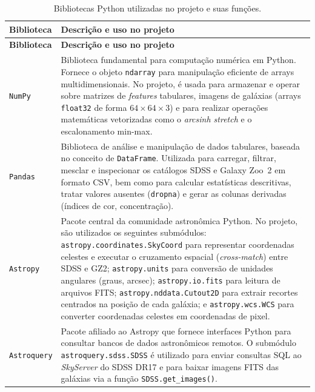 \documentclass[12pt, a4paper]{article}
\begin{document}
\begin{longtable}{lp{10.5cm}}
  \caption{Bibliotecas Python utilizadas no projeto e suas funções.}
  \label{tab:bibliotecas} \\
  \toprule
  \textbf{Biblioteca} & \textbf{Descrição e uso no projeto} \\
  \midrule
  \endfirsthead
  \toprule
  \textbf{Biblioteca} & \textbf{Descrição e uso no projeto} \\
  \midrule
  \endhead
  \bottomrule
  \endfoot

  \texttt{NumPy}
  & Biblioteca fundamental para computação numérica em Python. Fornece o
    objeto \texttt{ndarray} para manipulação eficiente de arrays
    multidimensionais. No projeto, é usada para armazenar e operar sobre
    matrizes de \textit{features} tabulares, imagens de galáxias
    (arrays \texttt{float32} de forma $64 \times 64 \times 3$) e para
    realizar operações matemáticas vetorizadas como o \textit{arcsinh
    stretch} e o escalonamento min-max. \\[6pt]

  \texttt{Pandas}
  & Biblioteca de análise e manipulação de dados tabulares, baseada no
    conceito de \texttt{DataFrame}. Utilizada para carregar, filtrar,
    mesclar e inspecionar os catálogos SDSS e Galaxy Zoo~2 em formato CSV,
    bem como para calcular estatísticas descritivas, tratar valores
    ausentes (\texttt{dropna}) e gerar as colunas derivadas (índices de
    cor, concentração). \\[6pt]

  \texttt{Astropy}
  & Pacote central da comunidade astronômica Python. No projeto, são
    utilizados os seguintes submódulos:
    \texttt{astropy.coordinates.SkyCoord} para representar coordenadas
    celestes e executar o cruzamento espacial (\textit{cross-match}) entre
    SDSS e GZ2;
    \texttt{astropy.units} para conversão de unidades angulares (graus,
    arcsec);
    \texttt{astropy.io.fits} para leitura de arquivos FITS;
    \texttt{astropy.nddata.Cutout2D} para extrair recortes centrados na
    posição de cada galáxia; e
    \texttt{astropy.wcs.WCS} para converter coordenadas celestes em
    coordenadas de pixel. \\[6pt]

  \texttt{Astroquery}
  & Pacote afiliado ao Astropy que fornece interfaces Python para consultar
    bancos de dados astronômicos remotos. O submódulo
    \texttt{astroquery.sdss.SDSS} é utilizado para enviar consultas SQL
    ao \textit{SkyServer} do SDSS DR17 e para baixar imagens FITS das
    galáxias via a função \texttt{SDSS.get\_images()}. \\[6pt]


\end{longtable}
\end{document}
